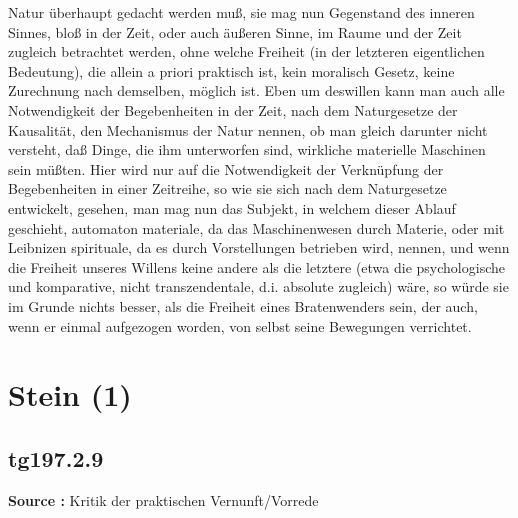\documentclass[a4paper,12pt,twoside]{book}
\newcommand{\unnumberedsection}[1]{
	\section*{#1}
	\addcontentsline{toc}{section}{#1}
	\markright{#1}
}
\begin{document}
Natur überhaupt gedacht werden muß, sie mag nun Gegenstand des inneren Sinnes, bloß in der Zeit, oder auch äußeren Sinne, im Raume und der Zeit zugleich betrachtet werden, ohne welche Freiheit (in der letzteren eigentlichen Bedeutung), die allein a priori praktisch ist, kein moralisch Gesetz, keine Zurechnung nach demselben, möglich ist. Eben um deswillen kann man auch alle Notwendigkeit der Begebenheiten in der Zeit, nach dem Naturgesetze der Kausalität, den Mechanismus der Natur nennen, ob man gleich darunter nicht versteht, daß Dinge, die ihm unterworfen sind, wirkliche materielle Maschinen sein müßten. Hier wird nur auf die Notwendigkeit der Verknüpfung der Begebenheiten in einer Zeitreihe, so wie sie sich nach dem Naturgesetze entwickelt, gesehen, man mag nun das Subjekt, in welchem dieser Ablauf geschieht, automaton materiale, da das Maschinenwesen durch Materie, oder mit Leibnizen spirituale, da es durch Vorstellungen betrieben wird, nennen, und wenn die Freiheit unseres Willens keine andere als die letztere (etwa die psychologische und komparative, nicht transzendentale, d.i. absolute zugleich) wäre, so würde sie im Grunde nichts besser, als die Freiheit eines Bratenwenders sein, der auch, wenn er einmal aufgezogen worden, von selbst seine Bewegungen verrichtet. 
	
	\unnumberedsection{Stein (1)} 
	\subsection*{tg197.2.9} 
	\textbf{Source : }Kritik der praktischen Vernunft/Vorrede\\  
	
\end{document}

